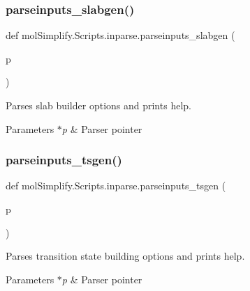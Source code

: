 \subsubsection{\texorpdfstring{parseinputs\+\_\+slabgen()}{parseinputs\_slabgen()}}
{\footnotesize\ttfamily def mol\+Simplify.\+Scripts.\+inparse.\+parseinputs\+\_\+slabgen (\begin{DoxyParamCaption}\item[{}]{p }\end{DoxyParamCaption})}



Parses slab builder options and prints help. 


\begin{DoxyParams}{Parameters}
{\em $\ast$p} & Parser pointer \\
\hline
\end{DoxyParams}
\mbox{\label{namespacemolSimplify_1_1Scripts_1_1inparse_aff289d30456d5d3038833050e26f61b1}} 
\subsubsection{\texorpdfstring{parseinputs\+\_\+tsgen()}{parseinputs\_tsgen()}}
{\footnotesize\ttfamily def mol\+Simplify.\+Scripts.\+inparse.\+parseinputs\+\_\+tsgen (\begin{DoxyParamCaption}\item[{}]{p }\end{DoxyParamCaption})}



Parses transition state building options and prints help. 


\begin{DoxyParams}{Parameters}
{\em $\ast$p} & Parser pointer \\
\hline
\end{DoxyParams}
